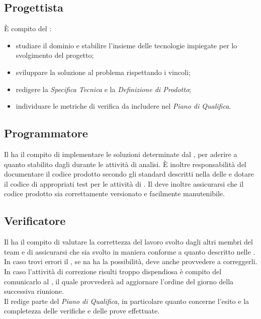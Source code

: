 \subsection{Progettista}
\`{E} compito del \Progettista:
\begin{itemize}
	\item studiare il dominio e stabilire l'insieme delle tecnologie impiegate per lo svolgimento del progetto;
	\item sviluppare la soluzione al problema rispettando i vincoli;
	\item redigere la \textit{Specifica Tecnica} e la \textit{Definizione di Prodotto};
	\item individuare le metriche di verifica da includere nel \textit{Piano di Qualifica}.
\end{itemize}

\subsection{Programmatore}
Il \Programmatore{} ha il compito di implementare le soluzioni determinate dal \Progettista, per aderire a quanto stabilito dagli \Analisti{} durante le attività di analisi. \`{E} inoltre responsabilità del \Programmatore{} documentare il codice prodotto secondo gli standard descritti nella  delle \NormeDiProgetto{} e dotare il codice di appropriati test per le attività di \VV. Il \Programmatore{} deve inoltre assicurarsi che il codice prodotto sia correttamente versionato e facilmente manutenibile.

\subsection{Verificatore}
Il \Verificatore{} ha il compito di valutare la correttezza del lavoro svolto dagli altri membri del team e di assicurarsi che sia svolto in maniera conforme a quanto descritto nelle \NormeDiProgetto. In caso trovi errori il \Verificatore, se na ha la possibilità, deve anche provvedere a correggerli. In caso l'attività di correzione risulti troppo dispendiosa è compito del \Verificatore{} comunicarlo al \Responsabile, il quale provvederà ad aggiornare l'ordine del giorno della successiva riunione.\\
Il \Verificatore{} redige parte del \textit{Piano di Qualifica}, in particolare quanto concerne l'esito e la completezza delle verifiche e delle prove effettuate.